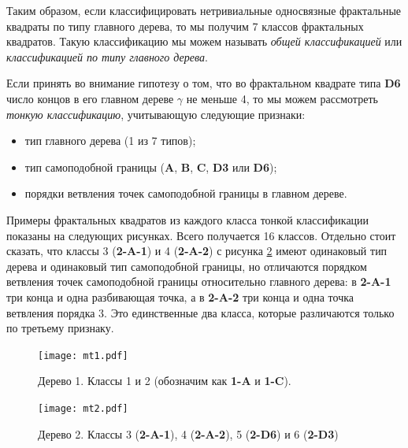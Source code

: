 Таким образом, если классифицировать нетривиальные односвязные фрактальные квадраты по типу главного дерева, то мы получим 7 классов фрактальных квадратов.
Такую классификацию мы можем называть {\em общей классификацией} или {\em классификацией по типу главного дерева}.

Если принять во внимание гипотезу о том, что во фрактальном квадрате типа {\bf D6} число концов в его главном дереве $\gamma$ не меньше 4, то мы можем рассмотреть {\em тонкую классификацию}, учитывающую следующие признаки:
\begin{itemize}[nolistsep]
	\item[1.] тип главного дерева (1 из 7 типов);
	\item[2.] тип самоподобной границы ({\bf A}, {\bf B}, {\bf C}, {\bf D3} или {\bf D6});
	\item[3.] порядки ветвления точек самоподобной границы в главном дереве.
\end{itemize}

Примеры фрактальных квадратов из каждого класса тонкой классификации показаны на следующих рисунках.
Всего получается 16 классов.
Отдельно стоит сказать, что классы 3 ({\bf 2-A-1}) и 4 ({\bf 2-A-2}) с рисунка \ref{fig:tree2} имеют одинаковый тип дерева и одинаковый тип самоподобной границы, но отличаются порядком ветвления точек самоподобной границы относительно главного дерева: в {\bf 2-A-1} три конца и одна разбивающая точка, а в {\bf 2-A-2} три конца и одна точка ветвления порядка 3.
Это единственные два класса, которые различаются только по третьему признаку.


\begin{figure}[H]
    \centering
    \texttt{[image: mt1.pdf]}
    \vspace{0.5cm}
    \vfill
    \hfill
    \caption{Дерево 1. Классы 1 и 2 (обозначим как \textbf{1-A} и \textbf{1-C}). }
    \label{fig:tree1}
\end{figure}

\begin{figure}[H]
    \centering
    \texttt{[image: mt2.pdf]}
    \vspace{0.5cm}\vfill
    \hfill
    \vspace{0.3cm}\vfill
    \hfill
    \caption{Дерево 2. Классы 3 ({\bf 2-A-1}), 4 ({\bf 2-A-2}), 5 ({\bf 2-D6}) и 6 ({\bf 2-D3})}
    \label{fig:tree2}
\end{figure}

